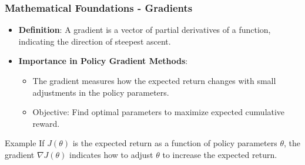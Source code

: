 \documentclass[aspectratio=169]{beamer}
\begin{document}
\begin{frame}[fragile]
    \frametitle{Mathematical Foundations - Gradients}
    \begin{itemize}
        \item \textbf{Definition}: A gradient is a vector of partial derivatives of a function, indicating the direction of steepest ascent.
        \item \textbf{Importance in Policy Gradient Methods}:
          \begin{itemize}
            \item The gradient measures how the expected return changes with small adjustments in the policy parameters.
            \item Objective: Find optimal parameters to maximize expected cumulative reward.
          \end{itemize}
    \end{itemize}
    
    \begin{block}{Example}
        If \( J(\theta) \) is the expected return as a function of policy parameters \( \theta \), the gradient \( \nabla J(\theta) \) indicates how to adjust \( \theta \) to increase the expected return.
    \end{block}
\end{frame}
\end{document}
